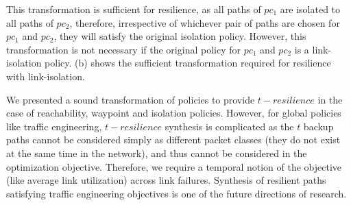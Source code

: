 This transformation is sufficient for resilience, as all paths of $pc_1$ are isolated to all paths of $pc_2$,
therefore, irrespective of whichever pair of paths are chosen for $pc_1$ and $pc_2$,
they will satisfy the original isolation policy. 
 However, this transformation is not necessary if the original policy for 
 $pc_1$ and $pc_2$ is a link-isolation policy. (b) shows
 the sufficient transformation required for resilience with link-isolation.

We presented a sound transformation of policies to provide $t-resilience$ in
the case of reachability, waypoint and isolation policies. However, for global policies like 
traffic engineering, $t-resilience$ synthesis is complicated as the $t$ backup paths 
cannot be considered simply as different packet classes (they do not exist at the same time
in the network),
and thus cannot be considered in the optimization objective. Therefore, we require a 
temporal notion of the objective (like average link utilization) across link failures.
 Synthesis of resilient paths
satisfying traffic engineering objectives is one of the future directions of research.